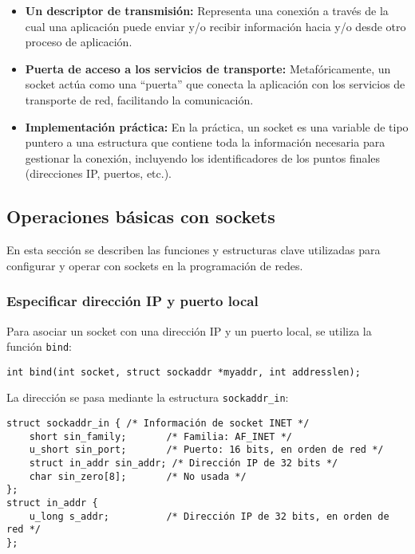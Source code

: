 \documentclass[a4paper,12pt]{article}
\begin{document}
\begin{itemize}
    \item \textbf{Un descriptor de transmisión:} Representa una conexión a través de la cual una aplicación puede enviar y/o recibir información hacia y/o desde otro proceso de aplicación.
    \item \textbf{Puerta de acceso a los servicios de transporte:} Metafóricamente, un socket actúa como una “puerta” que conecta la aplicación con los servicios de transporte de red, facilitando la comunicación.
    \item \textbf{Implementación práctica:} En la práctica, un socket es una variable de tipo puntero a una estructura que contiene toda la información necesaria para gestionar la conexión, incluyendo los identificadores de los puntos finales (direcciones IP, puertos, etc.).
\end{itemize}

\subsection{Operaciones básicas con sockets}

En esta sección se describen las funciones y estructuras clave utilizadas para configurar y operar con sockets en la programación de redes.

\subsubsection{Especificar dirección IP y puerto local}

Para asociar un socket con una dirección IP y un puerto local, se utiliza la función \texttt{bind}:

\begin{verbatim}
int bind(int socket, struct sockaddr *myaddr, int addresslen);
\end{verbatim}

La dirección se pasa mediante la estructura \texttt{sockaddr\_in}:

\begin{verbatim}
struct sockaddr_in { /* Información de socket INET */
    short sin_family;       /* Familia: AF_INET */
    u_short sin_port;       /* Puerto: 16 bits, en orden de red */
    struct in_addr sin_addr; /* Dirección IP de 32 bits */
    char sin_zero[8];       /* No usada */
};
struct in_addr {
    u_long s_addr;          /* Dirección IP de 32 bits, en orden de red */
};
\end{verbatim}
\end{document}
